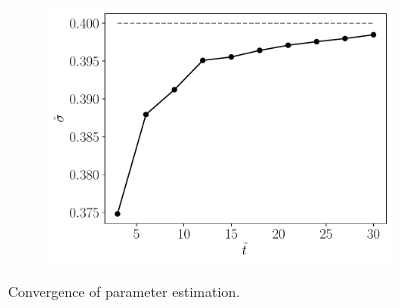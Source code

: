 \documentclass[11pt]{article}
\theoremstyle{definition}
\theoremstyle{remark}
\theoremstyle{remark}
\begin{document}
\begin{figure}[H]
\begin{subfigure}[b]{0.45\textwidth}
      \caption{}
  \end{subfigure}
  \begin{subfigure}[b]{0.45\textwidth}
      \centering
      \includegraphics[scale=0.45]{sigmas.pdf}
      \caption{}
  \end{subfigure}
  \caption{Convergence of parameter estimation.}
\end{figure}

\printbibliography
\end{document}
